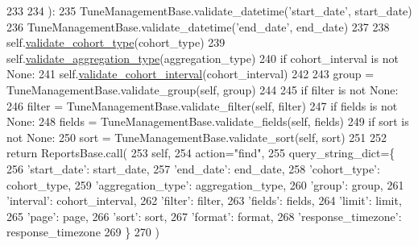 \begin{DoxyCode}
233 
234     ):
235         TuneManagementBase.validate\_datetime(\textcolor{stringliteral}{'start\_date'}, start\_date)
236         TuneManagementBase.validate\_datetime(\textcolor{stringliteral}{'end\_date'}, end\_date)
237 
238         self.\hyperlink{classtune_1_1management_1_1reports_1_1reports__insights__base_1_1ReportsInsightBase_a78f6a5bfe7258d65e381281510ae9909}{validate\_cohort\_type}(cohort\_type)
239         self.\hyperlink{classtune_1_1management_1_1reports_1_1reports__insights__base_1_1ReportsInsightBase_a21b9eb499a7eb17b2a9bb887d4490688}{validate\_aggregation\_type}(aggregation\_type)
240         \textcolor{keywordflow}{if} cohort\_interval \textcolor{keywordflow}{is} \textcolor{keywordflow}{not} \textcolor{keywordtype}{None}:
241             self.\hyperlink{classtune_1_1management_1_1reports_1_1reports__insights__base_1_1ReportsInsightBase_ad46443a32fbdae1590e4dfbeb945c566}{validate\_cohort\_interval}(cohort\_interval)
242 
243         group = TuneManagementBase.validate\_group(self, group)
244 
245         \textcolor{keywordflow}{if} filter \textcolor{keywordflow}{is} \textcolor{keywordflow}{not} \textcolor{keywordtype}{None}:
246             filter = TuneManagementBase.validate\_filter(self, filter)
247         \textcolor{keywordflow}{if} fields \textcolor{keywordflow}{is} \textcolor{keywordflow}{not} \textcolor{keywordtype}{None}:
248             fields = TuneManagementBase.validate\_fields(self, fields)
249         \textcolor{keywordflow}{if} sort \textcolor{keywordflow}{is} \textcolor{keywordflow}{not} \textcolor{keywordtype}{None}:
250             sort = TuneManagementBase.validate\_sort(self, sort)
251 
252         \textcolor{keywordflow}{return} ReportsBase.call(
253             self,
254             action=\textcolor{stringliteral}{"find"},
255             query\_string\_dict=\{
256                 \textcolor{stringliteral}{'start\_date'}: start\_date,
257                 \textcolor{stringliteral}{'end\_date'}: end\_date,
258                 \textcolor{stringliteral}{'cohort\_type'}: cohort\_type,
259                 \textcolor{stringliteral}{'aggregation\_type'}: aggregation\_type,
260                 \textcolor{stringliteral}{'group'}: group,
261                 \textcolor{stringliteral}{'interval'}: cohort\_interval,
262                 \textcolor{stringliteral}{'filter'}: filter,
263                 \textcolor{stringliteral}{'fields'}: fields,
264                 \textcolor{stringliteral}{'limit'}: limit,
265                 \textcolor{stringliteral}{'page'}: page,
266                 \textcolor{stringliteral}{'sort'}: sort,
267                 \textcolor{stringliteral}{'format'}: format,
268                 \textcolor{stringliteral}{'response\_timezone'}: response\_timezone
269             \}
270         )

\end{DoxyCode}


